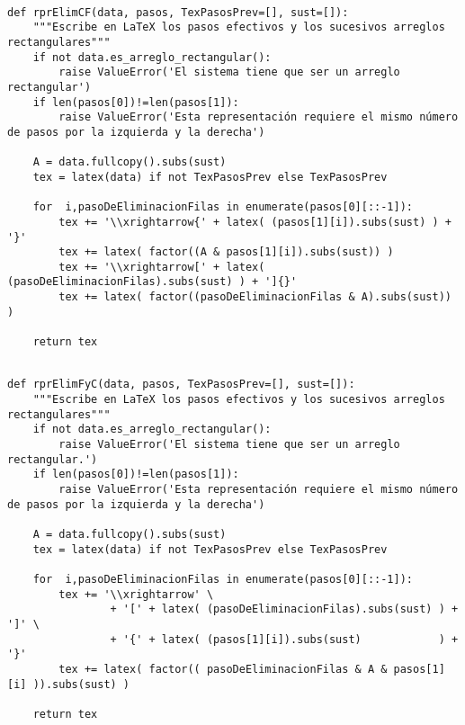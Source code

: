 \documentclass[11pt]{report}
\begin{document}
\begin{verbatim}

def rprElimCF(data, pasos, TexPasosPrev=[], sust=[]):
    """Escribe en LaTeX los pasos efectivos y los sucesivos arreglos rectangulares"""
    if not data.es_arreglo_rectangular():
        raise ValueError('El sistema tiene que ser un arreglo rectangular')
    if len(pasos[0])!=len(pasos[1]):
        raise ValueError('Esta representación requiere el mismo número de pasos por la izquierda y la derecha')
    
    A = data.fullcopy().subs(sust)                                                               
    tex = latex(data) if not TexPasosPrev else TexPasosPrev

    for  i,pasoDeEliminacionFilas in enumerate(pasos[0][::-1]):
        tex += '\\xrightarrow{' + latex( (pasos[1][i]).subs(sust) ) + '}'
        tex += latex( factor((A & pasos[1][i]).subs(sust)) )
        tex += '\\xrightarrow[' + latex( (pasoDeEliminacionFilas).subs(sust) ) + ']{}' 
        tex += latex( factor((pasoDeEliminacionFilas & A).subs(sust)) )
                                                               
    return tex

\end{verbatim}

\begin{verbatim}

def rprElimFyC(data, pasos, TexPasosPrev=[], sust=[]):
    """Escribe en LaTeX los pasos efectivos y los sucesivos arreglos rectangulares"""
    if not data.es_arreglo_rectangular():
        raise ValueError('El sistema tiene que ser un arreglo rectangular.')
    if len(pasos[0])!=len(pasos[1]):
        raise ValueError('Esta representación requiere el mismo número de pasos por la izquierda y la derecha')
    
    A = data.fullcopy().subs(sust)
    tex = latex(data) if not TexPasosPrev else TexPasosPrev

    for  i,pasoDeEliminacionFilas in enumerate(pasos[0][::-1]):
        tex += '\\xrightarrow' \
                + '[' + latex( (pasoDeEliminacionFilas).subs(sust) ) + ']' \
                + '{' + latex( (pasos[1][i]).subs(sust)            ) + '}'
        tex += latex( factor(( pasoDeEliminacionFilas & A & pasos[1][i] )).subs(sust) )
                                                               
    return tex

\end{verbatim}
\end{document}
